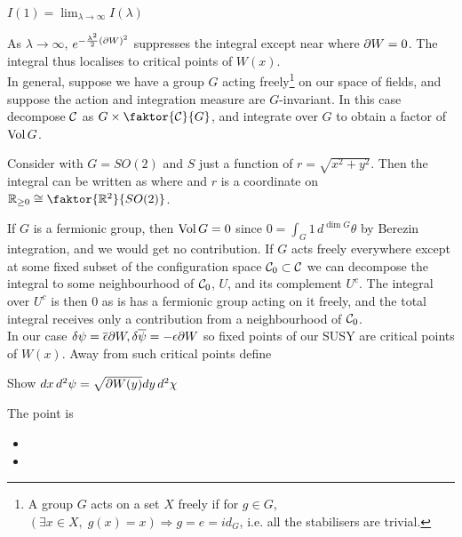 \documentclass{article}
\begin{document}
\begin{corollary}
$I(1) = \lim_{\lambda \to \infty} I(\lambda)$
\end{corollary}
As $\lambda \to \infty$, $e^{-\frac{\lambda^2}{2}(\partial W)^2}$ suppresses the integral except near where $\partial W = 0$. The integral thus localises to critical points of $W(x)$. \\
In general, suppose we have a group $G$ acting freely\footnote{A group $G$ acts on a set $X$ freely if for $g \in G$,  $(\exists x \in X, \; g(x)=x) \Rightarrow g=e=id_G$, i.e. all the stabilisers are trivial.} on our space of fields, and suppose the action and integration measure are $G$-invariant. In this case decompose $\mathcal{C}$ as $G \times \faktor{\mc{C}}{G}$, and integrate over $G$ to obtain a factor of $\operatorname{Vol} G$. 
\begin{example}
Consider
	with $G=SO(2)$ and $S$ just a function of $r=\sqrt{x^2+y^2}$. Then the integral can be written as 
where 
and $r$ is a coordinate on $\mbb{R}_{\geq 0} \cong \faktor{\mbb{R}^2}{SO(2)}$.
\end{example}
If $G$ is a fermionic group, then $\operatorname{Vol} G = 0$ since $0 = \int_G 1 \, d^{\dim G} \theta$ by Berezin integration, and we would get no contribution. If $G$ acts freely everywhere except at some fixed subset of the configuration space $\mathcal{C}_0 \subset \mathcal{C}$ we can decompose the integral to some neighbourhood of $\mathcal{C}_0$, $U$, and its complement $U^c$. The integral over $U^c$ is then 0 as is has a fermionic group acting on it freely, and the total integral receives only a contribution from a neighbourhood of $\mathcal{C}_0$.  \\
In our case $\delta \psi = \overline{\epsilon} \partial W, \delta \overline{\psi} = -\epsilon \partial W$ so fixed points of our SUSY are critical points of $W(x)$. Away from such critical points define 
\begin{ex}
Show $dx\, d^2 \psi = \sqrt{\partial W(y)} dy \, d^2\chi$
\end{ex}
The point is
\begin{itemize}
\item {} 
\item {}
\end{itemize}
\end{document}
